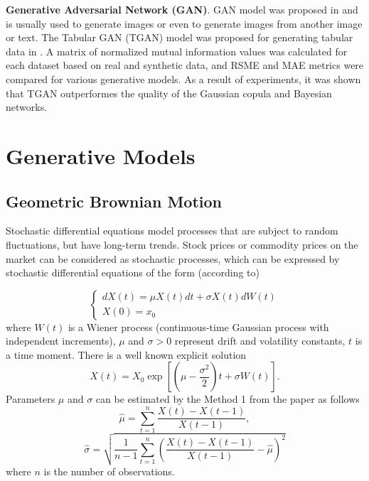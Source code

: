 \documentclass{article}
\begin{document}
\textbf{Generative Adversarial Network (GAN)}. GAN model was proposed in \cite{goodfellow2014generative} and is usually used to generate images \cite{radford2015unsupervised} or even to generate images from another image or text. The Tabular GAN (TGAN) model was proposed for generating tabular data in \cite{xu2018synthesizing}. A matrix of normalized mutual information values was calculated for each dataset based on real and synthetic data, and RSME and MAE metrics were compared for various generative models. As a result of experiments, it was shown that TGAN outperformes the quality of the Gaussian copula and Bayesian networks.

\section{Generative Models}
\label{section:models}

\subsection{Geometric Brownian Motion}
\label{section:gdm}

Stochastic differential equations model processes that are subject to random fluctuations, but have long-term trends. Stock prices or commodity prices on the market can be considered as stochastic processes, which can be expressed by stochastic differential equations of the form (according to\cite{Lidn2018StockPP})

\begin{equation*}
\begin{cases}
dX(t) = \mu X(t) dt + \sigma X(t) d W(t) \\
X(0) = x_0
\end{cases}
\end{equation*}
where $W(t)$ is a Wiener process (continuous-time Gaussian process with independent increments), $\mu$ and $\sigma > 0$ represent drift and volatility constants, $t$ is a time moment. There is a well known \cite{Lidn2018StockPP} explicit solution
\begin{equation*}
X(t) = X_0 \exp\left[ \left(\mu - \frac{\sigma^2}{2} \right) t + \sigma W(t) \right].
\end{equation*}
Parameters $\mu$ and $\sigma$ can be estimated by the Method 1 from the paper \cite{Croghan2017EstimationOG} as follows
\begin{equation*}
\hat{\mu}=\sum_{t=1}^{n} \frac{X(t)-X(t-1)}{X(t-1)},
\end{equation*}
\begin{equation*}
\hat{\sigma}=\sqrt{\frac{1}{n-1} \sum_{t=1}^{n}\left(\frac{X(t)-X(t-1)}{X(t-1)}-\hat{\mu}\right)^{2}}
\end{equation*}
where $n$ is the number of observations. 
\end{document}
